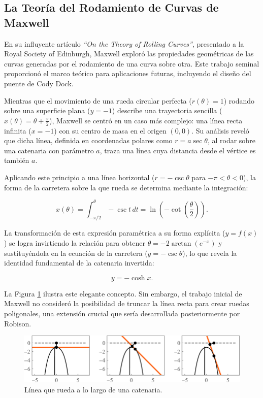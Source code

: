 \documentclass{IEEEtran}
\begin{document}
\subsection{La Teoría del Rodamiento de Curvas de Maxwell}

En su influyente artículo \textit{``On the Theory of Rolling Curves''}, presentado a la Royal Society of Edinburgh, Maxwell exploró las propiedades geométricas de las curvas generadas por el rodamiento de una curva sobre otra. Este trabajo seminal proporcionó el marco teórico para aplicaciones futuras, incluyendo el diseño del puente de Cody Dock.

Mientras que el movimiento de una rueda circular perfecta ($r(\theta) = 1$) rodando sobre una superficie plana ($y = -1$) describe una trayectoria sencilla ($x(\theta) = \theta + \frac{\pi}{2}$), Maxwell se centró en un caso más complejo: una línea recta infinita ($x = -1$) con su centro de masa en el origen $(0,0)$. Su análisis reveló que dicha línea, definida en coordenadas polares como $r = a \sec \theta$, al rodar sobre una catenaria con parámetro $a$, traza una línea cuya distancia desde el vértice es también $a$.

Aplicando este principio a una línea horizontal ($r = -\csc \theta$ para $-\pi < \theta < 0$), la forma de la carretera sobre la que rueda se determina mediante la integración:

\[
x(\theta) = \int_{-\pi/2}^{\theta} -\csc t \, dt = \ln\left(-\cot\left(\frac{\theta}{2}\right)\right).
\]

La transformación de esta expresión paramétrica a su forma explícita ($y = f(x)$) se logra invirtiendo la relación para obtener $\theta = -2 \arctan(e^{-x})$ y sustituyéndola en la ecuación de la carretera ($y = -\csc \theta$), lo que revela la identidad fundamental de la catenaria invertida:

\[
y = -\cosh x.
\]

La Figura \ref{fig: A line rolling along a catenary} ilustra este elegante concepto. Sin embargo, el trabajo inicial de Maxwell no consideró la posibilidad de truncar la línea recta para crear ruedas poligonales, una extensión crucial que sería desarrollada posteriormente por Robison.

\begin{figure}[h]
    \centering
    \includegraphics[width = 0.5 \textwidth]{Imagenes/A line rolling along a catenary.png}
    \caption{Línea que rueda a lo largo de una catenaria.}
    \label{fig: A line rolling along a catenary}
\end{figure}
\end{document}
